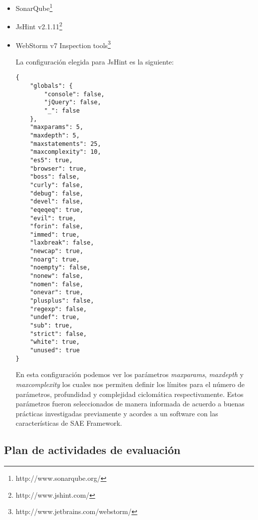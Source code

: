 \begin{itemize}
\item SonarQube\footnote{http://www.sonarqube.org/}
\item JsHint v2.1.11\footnote{http://www.jshint.com/}
\item WebStorm v7 Inspection tools\footnote{http://www.jetbrains.com/webstorm/}


La configuración elegida para JsHint es la siguiente:
\begin{verbatim}
{
    "globals": {
        "console": false,
        "jQuery": false,
        "_": false
    },
    "maxparams": 5,
    "maxdepth": 5,
    "maxstatements": 25,
    "maxcomplexity": 10,
    "es5": true,
    "browser": true,
    "boss": false,
    "curly": false,
    "debug": false,
    "devel": false,
    "eqeqeq": true,
    "evil": true,
    "forin": false,
    "immed": true,
    "laxbreak": false,
    "newcap": true,
    "noarg": true,
    "noempty": false,
    "nonew": false,
    "nomen": false,
    "onevar": true,
    "plusplus": false,
    "regexp": false,
    "undef": true,
    "sub": true,
    "strict": false,
    "white": true,
    "unused": true
}
\end{verbatim}

En esta configuración podemos ver los parámetros \textit{maxparams}, \textit{maxdepth} 
y \textit{maxcomplexity} los cuales nos permiten definir los límites para el número de parámetros, 
profundidad y complejidad ciclomática respectivamente. Estos parámetros fueron seleccionados de manera 
informada de acuerdo a buenas prácticas investigadas previamente y acordes a un software con las 
características de SAE Framework.
\end{itemize}

\subsection{Plan de actividades de evaluación}


